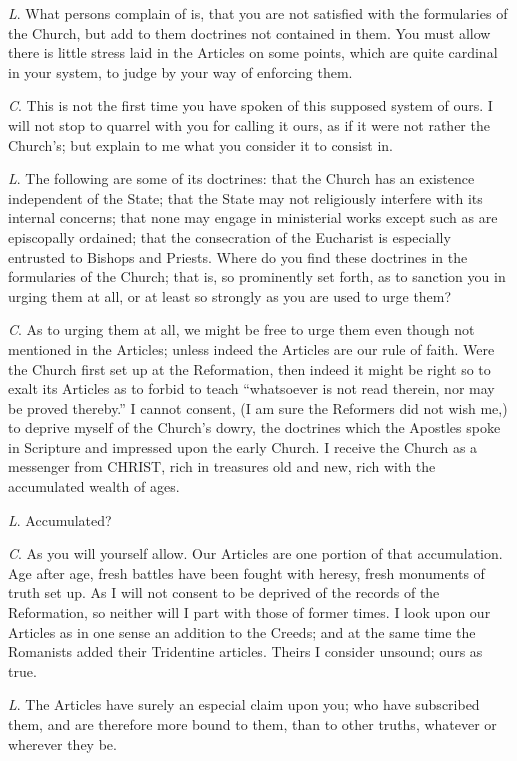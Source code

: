 \emph{L}. What persons complain of is, that you
are not satisfied with the formularies of the Church, but add to them
doctrines not contained in them. You must allow there is little
stress laid in the Articles on some points, which are quite cardinal
in your system, to judge by your way of enforcing them.

\emph{C}. This is not the first time you have
spoken of this supposed system of ours. I will not stop to quarrel
with you for calling it ours, as if it were not rather the Church's;
but explain to me what you consider it to consist in.

\emph{L}. The following are some of its
doctrines: that the Church has an existence independent of the State;
that the State may not religiously interfere with its internal
concerns; that none may engage in ministerial works except such as are
episcopally ordained; that the consecration of the Eucharist is
especially entrusted to Bishops and Priests. Where do you find these
doctrines in the formularies of the Church; that is, so prominently
set forth, as to sanction you in urging them at all, or at least so
strongly as you are used to urge them?

\emph{C}. As to urging them at all, we might be
free to urge them even though not mentioned in the Articles; unless
indeed the Articles are our rule of faith. Were the Church first set
up at the Reformation, then indeed it might be right so to exalt its
Articles as to forbid to teach ``whatsoever is not read therein, nor
may be proved thereby.'' I cannot consent, (I am sure the Reformers did
not wish me,) to deprive myself of the Church's dowry, the doctrines
which the Apostles spoke in Scripture and impressed upon the early
Church. I receive the Church as a messenger from CHRIST,
rich in treasures old and new, rich with the accumulated wealth of
ages.

\emph{L}. Accumulated?

\emph{C}. As you will yourself allow. Our
Articles are one portion of that accumulation. Age after age, fresh
battles have been fought with heresy, fresh monuments of truth set up.
As I will not consent to be deprived of the records of the
Reformation, so neither will I part with those of former times. I look
upon our Articles as in one sense an addition to the Creeds; and at
the same time the Romanists added their Tridentine articles. Theirs I
consider unsound; ours as true.

\emph{L}. The Articles have surely an especial
claim upon you; who have subscribed them, and are therefore more bound
to them, than to other truths, whatever or wherever they be.

